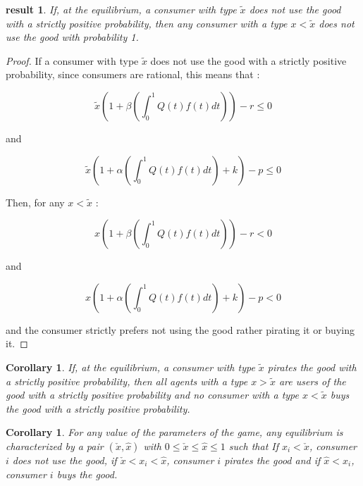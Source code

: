 \documentclass[12pt]{article}
\newtheorem{corollary}[theorem]{Corollary}
\newtheorem{result}{result}
\numberwithin{equation}{section}
\begin{document}
\begin{result}
If, at the equilibrium, a consumer with type $\tilde{x}$ does not use the good with a strictly positive probability, then any consumer with a type $x<\tilde{x}$ does not use the good with probability 1. 
\end{result}

\begin{proof}

If a consumer with type $\tilde{x}$ does not use the good with a strictly positive probability, since consumers are rational, this means that : 

\begin{equation}
\tilde{x}(1+\beta (\int^{1}_{0}Q(t)f(t)dt))-r \leq 0
\end{equation}

and

\begin{equation}
\tilde{x}(1+\alpha (\int^{1}_{0}Q(t)f(t)dt)+k)-p \leq  0 
\end{equation}


Then, for any $x<\tilde{x}$ :

\begin{equation}
x(1+\beta (\int^{1}_{0}Q(t)f(t)dt))-r < 0
\end{equation}

and

\begin{equation}
x(1+\alpha (\int^{1}_{0}Q(t)f(t)dt)+k)-p <  0 
\end{equation}

and the consumer strictly prefers not using the good rather pirating it or buying it.


\end{proof}

\begin{corollary}
If, at the equilibrium, a consumer with type $\tilde{x}$ pirates the good with a strictly positive probability, then all agents with a type $x>\tilde{x}$ are users of the good with a strictly positive probability and no consumer  with a type $x<\tilde{x}$ buys the good with a strictly positive probability.
\end{corollary}

\begin{corollary}
For any value of the parameters of the game, any equilibrium is characterized by a pair $(\check{x},\hat{x})$ with $0\leq \check{x} \leq \hat{x} \leq 1$ such that If $x_i<\check{x}$, consumer $i$ does not use the good, if $\check{x} <x_i <\hat{x}$, consumer $i$ pirates the good and if $\hat{x}<x_i$, consumer $i$ buys the good. 
\end{corollary}
\end{document}
